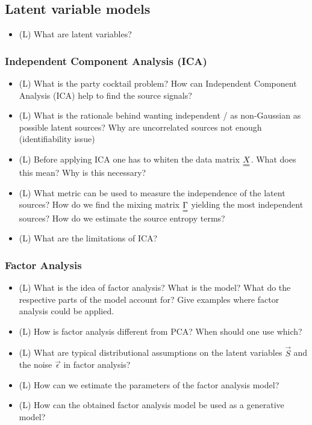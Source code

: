 \subsection*{Latent variable models}

\begin{itemize}
    \item (L) What are latent variables?
    \answerboxS
\end{itemize}

\subsubsection*{Independent Component Analysis (ICA)}

\begin{itemize}
    \item (L) What is the party cocktail problem? How can Independent Component Analysis (ICA) help to find the source signals?
    \answerboxM
    \item (L) What is the rationale behind wanting independent / as non-Gaussian as possible latent sources? Why are uncorrelated sources not enough (identifiability issue)
    \answerboxM
    \item (L) Before applying ICA one has to whiten the data matrix $\mat{X}$. What does this mean? Why is this necessary?
    \answerboxM
    \item (L) What metric can be used to measure the independence of the latent sources? How do we find the 
    mixing matrix $\mat{\Gamma}$ yielding the most independent sources? How do we estimate the source entropy terms?
    \answerboxL
    \item (L) What are the limitations of ICA?
    \answerboxM
\end{itemize}

\subsubsection*{Factor Analysis}
\begin{itemize}
    \item (L) What is the idea of factor analysis? What is the model? What do the respective parts of the model account for?
    Give examples where factor analysis could be applied.
    \answerboxM
    \item (L) How is factor analysis different from PCA? When should one use which?
    \answerboxM
    \item (L) What are typical distributional assumptions on the latent variables $\vec{S}$ and 
    the noise $\vec{\epsilon}$ in factor analysis?
    \answerboxM
    \item (L) How can we estimate the parameters of the factor analysis model?
    \answerboxM
    \item (L) How can the obtained factor analysis model be used as a generative model?
    \answerboxM
\end{itemize}

